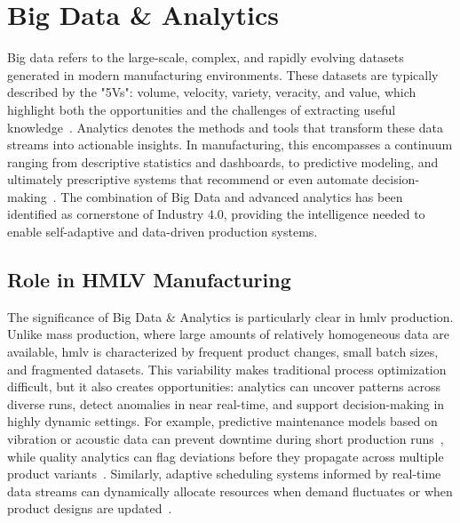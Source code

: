 \section{Big Data \& Analytics}\label{sec:big-data}

Big data refers to the large-scale, complex, and rapidly evolving datasets generated in modern manufacturing environments.
These datasets are typically described by the "5Vs": volume, velocity, variety, veracity, and value, which highlight both the opportunities and the challenges of extracting useful knowledge~\cite{wang-current-status-and-advancement-of-cyber}.
Analytics denotes the methods and tools that transform these data streams into actionable insights.
In manufacturing, this encompasses a continuum ranging from descriptive statistics and dashboards, to predictive modeling, and ultimately prescriptive systems that recommend or even automate decision-making~\cite{LEE-2015-a-cps-for-indsutry40-based-manufacturing-systems, lu-indsutry-40-a-survey-on-technologies}.
The combination of Big Data and advanced analytics has been identified as cornerstone of Industry 4.0, providing the intelligence needed to enable self-adaptive and data-driven production systems.

\subsection{Role in HMLV Manufacturing}
The significance of Big Data \& Analytics is particularly clear in \ac{hmlv} production.
Unlike mass production, where large amounts of relatively homogeneous data are available, \ac{hmlv} is characterized by frequent product changes, small batch sizes, and fragmented datasets.
This variability makes traditional process optimization difficult, but it also creates opportunities: analytics can uncover patterns across diverse runs, detect anomalies in near real-time, and support decision-making in highly dynamic settings.
For example, predictive maintenance models based on vibration or acoustic data can prevent downtime during short production runs~\cite{wuest-machine-learning-in-manufacturing-advantages}, while quality analytics can flag deviations before they propagate across multiple product variants~\cite{zhong-intelligent-manufacturing-in-the-context}.
Similarly, adaptive scheduling systems informed by real-time data streams can dynamically allocate resources when demand fluctuates or when product designs are updated~\cite{al-fuqaha-internet-of-things-a-survey-on-enabling}.

